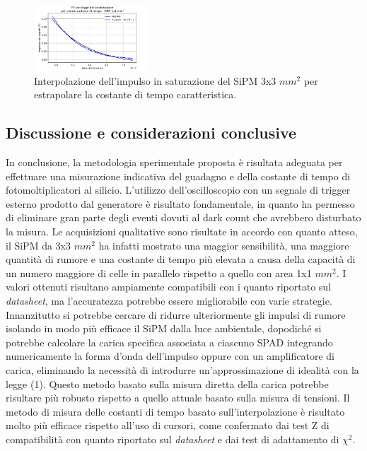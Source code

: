 \documentclass[journal]{IEEEtran}
\begin{document}
\begin{figure}[H]%
\begin{center}
\includegraphics[width=0.38\textwidth]{analysis/output/SiPM_fit_1mm.pdf}
\caption{Interpolazione dell'impulso in saturazione del SiPM 3x3 $mm^2$ per estrapolare la costante di tempo caratteristica.}
\label{fig:fit3m}
\end{center}
\end{figure}

\subsection{\textbf{Discussione e considerazioni conclusive}}
In conclusione, la metodologia sperimentale proposta è risultata adeguata per effettuare una misurazione indicativa del guadagno e della costante di tempo di fotomoltiplicatori al silicio. L'utilizzo dell'oscilloscopio con un segnale di trigger esterno prodotto dal generatore è risultato fondamentale, in quanto ha permesso di eliminare gran parte degli eventi dovuti al dark count che avrebbero disturbato la misura. Le acquisizioni qualitative sono risultate in accordo con quanto atteso, il SiPM da 3x3 $mm^2$ ha infatti mostrato una maggior sensibilità, una maggiore quantità di rumore e una costante di tempo più elevata a causa della capacità di un numero maggiore di celle in parallelo  rispetto a quello con area 1x1 $mm^2$. I valori ottenuti risultano ampiamente compatibili con i quanto riportato sul \textit{datasheet}, ma l'accuratezza potrebbe essere migliorabile con varie strategie. Innanzitutto si potrebbe cercare di ridurre ulteriormente gli impulsi di rumore isolando in modo più efficace il SiPM dalla luce ambientale, dopodiché si potrebbe calcolare la carica specifica associata a ciascuno SPAD integrando numericamente la forma d'onda dell'impulso oppure con un amplificatore di carica, eliminando la necessità di introdurre un'approssimazione di idealità con la legge (1). Questo metodo basato sulla misura diretta della carica potrebbe risultare più robusto rispetto a quello attuale basato sulla misura di tensioni. Il metodo di misura delle costanti di tempo basato sull'interpolazione è risultato molto più efficace rispetto all'uso di cursori, come confermato dai test Z di compatibilità con quanto riportato sul \textit{datasheet} e dai test di adattamento di $\chi^2$.
\end{document}
